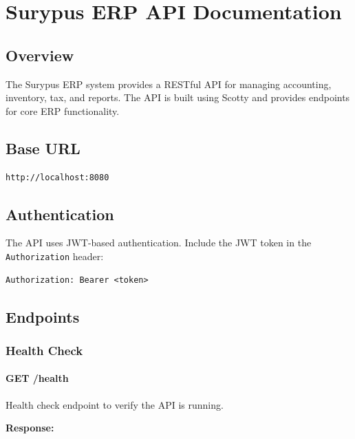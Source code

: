 \chapter{Surypus ERP API
Documentation}\label{surypus-erp-api-documentation}

\section{Overview}\label{overview}

The Surypus ERP system provides a RESTful API for managing accounting,
inventory, tax, and reports. The API is built using Scotty and provides
endpoints for core ERP functionality.

\section{Base URL}\label{base-url}

\begin{verbatim}
http://localhost:8080
\end{verbatim}

\section{Authentication}\label{authentication}

The API uses JWT-based authentication. Include the JWT token in the
\texttt{Authorization} header:

\begin{verbatim}
Authorization: Bearer <token>
\end{verbatim}

\section{Endpoints}\label{endpoints}

\subsection{Health Check}\label{health-check}

\subsubsection{GET /health}\label{get-health}

Health check endpoint to verify the API is running.

\textbf{Response:}

